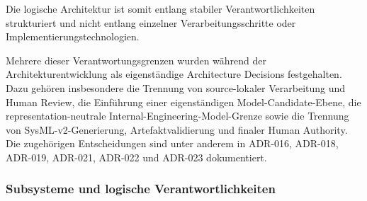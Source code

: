 Die logische Architektur ist somit entlang stabiler Verantwortlichkeiten
strukturiert und nicht entlang einzelner Verarbeitungsschritte oder
Implementierungstechnologien.

Mehrere dieser Verantwortungsgrenzen wurden während der Architekturentwicklung
als eigenständige Architecture Decisions festgehalten. Dazu gehören
insbesondere die Trennung von source-lokaler Verarbeitung und Human Review,
die Einführung einer eigenständigen Model-Candidate-Ebene, die
representation-neutrale Internal-Engineering-Model-Grenze sowie die Trennung
von SysML-v2-Generierung, Artefaktvalidierung und finaler Human Authority.
Die zugehörigen Entscheidungen sind unter anderem in ADR-016, ADR-018,
ADR-019, ADR-021, ADR-022 und ADR-023 dokumentiert.

\subsubsection{Subsysteme und logische Verantwortlichkeiten}
\label{sec:subsysteme_logische_verantwortlichkeiten}

